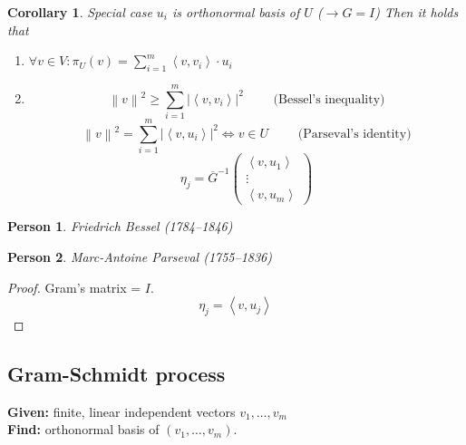 \documentclass[a4paper]{article}
\newcounter{lecref}[section]
\numberwithin{lecref}{section}
\newtheorem{corollary}[lecref]{Corollary}
\newtheorem*{Person}{Person}
\newcommand{\ip}[2]{\left\langle#1,#2\right\rangle} %
\newcommand{\norm}[1]{\left\|#1\right\|}
\newcommand{\card}[1]{\left|#1\right|}
\begin{document}
\begin{corollary} %
  \label{ONRcor}
  Special case $u_i$ is orthonormal basis of $U$ ($\rightarrow G = I$)
  Then it holds that
  \begin{enumerate}
    \item $\forall v \in V: \pi_U(v) = \sum_{i=1}^m \ip{v}{v_i} \cdot u_i$
    \item
      \[ \norm{v}^2 \geq \sum_{i=1}^m \card{\ip{v}{v_i}}^2 \qquad \text{ (Bessel's inequality)} \]
      \[ \norm{v}^2 = \sum_{i=1}^m \card{\ip{v}{u_i}}^2 \iff v \in U \qquad \text{ (Parseval's identity)} \]
      \[ \eta_j = \overline{G}^{-1}\begin{pmatrix} \ip{v}{u_1} \\ \vdots \\ \ip{v}{u_m} \end{pmatrix} \]
  \end{enumerate}
\end{corollary}

\begin{Person}
  Friedrich Bessel (1784--1846)
\end{Person}
\begin{Person}
  Marc-Antoine Parseval (1755--1836)
\end{Person}

\begin{proof}
  Gram's matrix = $I$.
  \[ \eta_j = \ip{v}{u_j} \]
\end{proof}

\subsection{Gram-Schmidt process}

\textbf{Given:} finite, linear independent vectors $v_1, \dots, v_m$ \\
\textbf{Find:} orthonormal basis of $(v_1, \dots, v_m)$.
\end{document}
